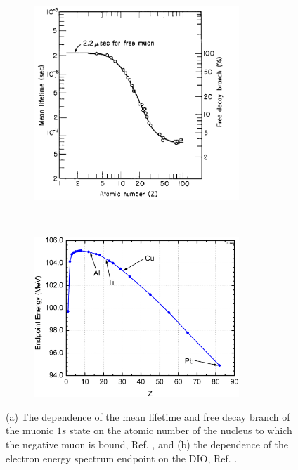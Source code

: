 \begin{figure}[!h]
    \centering
    \begin{subfigure}[t]{0.5\textwidth}
        \centering
        \includegraphics[width=0.85\textwidth]{figures/png/lifetime_mu_matter.png}
        \caption{}
        \label{fig:muonicatom}
    \end{subfigure}%
    ~ 
    \begin{subfigure}[t]{0.5\textwidth}
        \centering
        \includegraphics[width=0.85\textwidth]{figures/png/endopint.png}
        \caption{}
        \label{fig:endpoint}
    \end{subfigure}
   \caption[The muonic atom mean lifetime and free decay branch. The dependence 
   of the electron energy spectrum endpoint
   on the DIO.]{(a) The dependence of the mean lifetime and free decay branch
   of the muonic $1s$ state on the atomic number of the nucleus to which 
   the negative muon is bound, Ref. \cite{TYamazaki_1975}, and (b) 
   the dependence of the electron 
   energy spectrum endpoint on the DIO, Ref. \cite{dukes}.}
    \label{fig:2imins}
  \end{figure}
